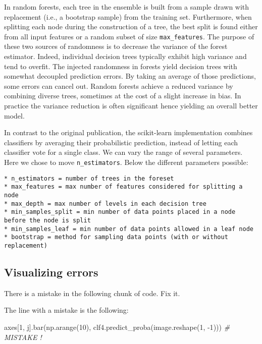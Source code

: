 \documentclass[10pt,a4paper]{article}
\newenvironment{Shaded}{\begin{snugshade}}{\end{snugshade}}
\newcommand{\CommentTok}[1]{\textcolor[rgb]{0.56,0.35,0.01}{\textit{#1}}}
\newcommand{\DecValTok}[1]{\textcolor[rgb]{0.00,0.00,0.81}{#1}}
\newcommand{\NormalTok}[1]{#1}
\theoremstyle{break}
\begin{document}
In random forests, each tree in the ensemble is built from a sample drawn with replacement (i.e., a bootstrap sample) from the training set. Furthermore, when splitting each node during the construction of a tree, the best split is found either from all input features or a random subset of size \texttt{max\_features}. The purpose of these two sources of randomness is to decrease the variance of the forest estimator. Indeed, individual decision trees typically exhibit high variance and tend to overfit. The injected randomness in forests yield decision trees with somewhat decoupled prediction errors. By taking an average of those predictions, some errors can cancel out. Random forests achieve a reduced variance by combining diverse trees, sometimes at the cost of a slight increase in bias. In practice the variance reduction is often significant hence yielding an overall better model.

In contrast to the original publication, the scikit-learn implementation combines classifiers by averaging their probabilistic prediction, instead of letting each classifier vote for a single class. We can vary the range of several parameters. Here we chose to move \texttt{n\_estimators}. Below the different parameters possible:

\begin{verbatim}
* n_estimators = number of trees in the foreset
* max_features = max number of features considered for splitting a node
* max_depth = max number of levels in each decision tree
* min_samples_split = min number of data points placed in a node before the node is split
* min_samples_leaf = min number of data points allowed in a leaf node
* bootstrap = method for sampling data points (with or without replacement)
\end{verbatim}

\hypertarget{visualizing-errors}{%
\subsection{Visualizing errors}\label{visualizing-errors}}

\begin{tcolorbox}

There is a mistake in the following chunk of code. Fix it.

\end{tcolorbox}

The line with a mistake is the following:

\begin{Shaded}
\begin{Highlighting}[]
\NormalTok{axes[}\DecValTok{1}\NormalTok{, j].bar(np.arange(}\DecValTok{10}\NormalTok{), clf4.predict_proba(image.reshape(}\DecValTok{1}\NormalTok{, }\DecValTok{-1}\NormalTok{)))  }\CommentTok{# MISTAKE !}
\end{Highlighting}
\end{Shaded}
\end{document}
